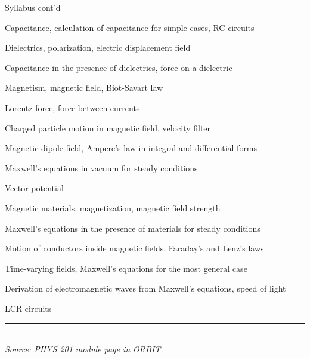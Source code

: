 \begin{frame}{Syllabus cont'd}

\begin{itemize}
{\small
\item
Capacitance, calculation of capacitance for simple cases, RC circuits
\item
Dielectrics, polarization, electric displacement field
\item
Capacitance in the presence of dielectrics, force on a dielectric
\item
Magnetism, magnetic field, Biot-Savart law
\item
Lorentz force, force between currents
\item
Charged particle motion in magnetic field, velocity filter
\item
Magnetic dipole field, Ampere’s law in integral and differential forms
\item
Maxwell’s equations in vacuum for steady conditions
\item
Vector potential
\item
Magnetic materials, magnetization, magnetic field strength
\item
Maxwell’s equations in the presence of materials for steady conditions
\item
Motion of conductors inside magnetic fields, Faraday’s and Lenz’s laws
\item
Time-varying fields, Maxwell’s equations for the most general case
\item
Derivation of electromagnetic waves from Maxwell’s equations, speed of light
\item
LCR circuits
}
\end{itemize}

\vspace{0.2cm}
\noindent\rule{2cm}{0.4pt}\\
{\it \scriptsize Source: PHYS 201 module page in ORBIT.}

\end{frame}

%
%
%

